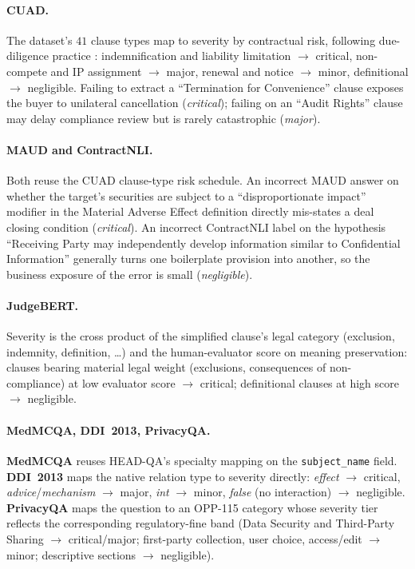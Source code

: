 \documentclass[11pt]{article}
\begin{document}
\paragraph{CUAD.}
The dataset's $41$ clause types map to severity by contractual
risk, following due-diligence practice
\citep{guha2023legalbench}: indemnification and liability
limitation $\to$ critical, non-compete and IP assignment
$\to$ major, renewal and notice $\to$ minor, definitional
$\to$ negligible. Failing to extract a \enquote{Termination for
Convenience} clause exposes the buyer to unilateral
cancellation (\emph{critical}); failing on an \enquote{Audit Rights}
clause may delay compliance review but is rarely catastrophic
(\emph{major}).

\paragraph{MAUD and ContractNLI.}
Both reuse the CUAD clause-type risk schedule. An incorrect MAUD
answer on whether the target's securities are subject to a
\enquote{disproportionate impact} modifier in the Material Adverse
Effect definition directly mis-states a deal closing condition
(\emph{critical}). An incorrect ContractNLI label on the
hypothesis \enquote{Receiving Party may independently develop
information similar to Confidential Information} generally
turns one boilerplate provision into another, so the business
exposure of the error is small (\emph{negligible}).

\paragraph{JudgeBERT.}
Severity is the cross product of the simplified clause's legal
category (exclusion, indemnity, definition, \dots) and the
human-evaluator score on meaning preservation: clauses bearing
material legal weight (exclusions, consequences of
non-compliance) at low evaluator score $\to$ critical;
definitional clauses at high score $\to$ negligible.

\paragraph{MedMCQA, DDI~2013, PrivacyQA.}
\textbf{MedMCQA} reuses HEAD-QA's specialty mapping on the
\texttt{subject\_name} field. \textbf{DDI~2013} maps the native
relation type to severity directly: \emph{effect} $\to$
critical, \emph{advice}/\emph{mechanism} $\to$ major,
\emph{int} $\to$ minor, \emph{false} (no interaction) $\to$
negligible. \textbf{PrivacyQA} maps the question to an OPP-115
category \citep{wilson2016opp115} whose severity tier reflects
the corresponding regulatory-fine band (Data Security and
Third-Party Sharing $\to$ critical/major; first-party
collection, user choice, access/edit $\to$ minor; descriptive
sections $\to$ negligible).
\end{document}
